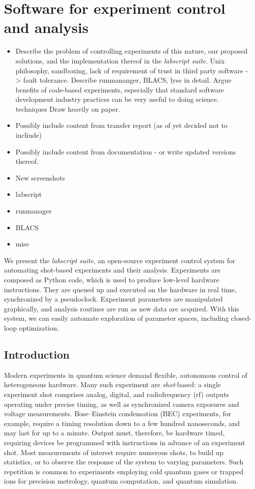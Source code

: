 \chapter{Software for experiment control and analysis}\label{chap:software}

\begin{itemize}
\item Describe the problem of controlling experiments of this nature, our proposed solutions, and the implementation thereof in the \emph{labscript suite}. Unix philosophy, sandboxing, lack of requirement of trust in third party software -> fault tolerance. Describe runmananger, BLACS, lyse in detail. Argue benefits of code-based experiments, especially that standard software development industry practices can be very useful to doing science. techniques Draw heavily on paper.
\item Possibly include content from transfer report (as of yet decided not to incliude)
\item Possibly include content from documentation - or write updated versions thereof.
\item New screenshots
\item{labscript}
\item{runmanager}
\item{BLACS}
\item{mise}
\end{itemize}

We present the \textit{labscript suite}, an open-source experiment control system for automating shot-based experiments and their analysis.
Experiments are composed as Python code, which is used to produce low-level hardware instructions.
They are queued up and executed on the hardware in real time, synchronized by a pseudoclock.
Experiment parameters are manipulated graphically, and analysis routines are run as new data are acquired.
With this system, we can easily automate exploration of parameter spaces, including closed-loop optimization.


\section{Introduction}
Modern experiments in quantum science demand flexible, autonomous control of heterogeneous hardware.
Many such experiment are \textit{shot}-based: a single experiment shot comprises analog, digital, and radiofrequency (rf) outputs operating under precise timing, as well as synchronized camera exposures and voltage measurements.
Bose--Einstein condensation (BEC) experiments\cite{weidemuller_cold_2009}, for example, require a timing resolution down to a few hundred nanoseconds, and may last for up to a minute.
Output must, therefore, be hardware timed, requiring devices be programmed with instructions in advance of an experiment shot.
Most measurements of interest require numerous shots, to build up statistics, or to observe the response of the system to varying parameters.
Such repetition is common to experiments employing cold quantum gases or trapped ions for precision metrology\cite{robins_atom_2013, cronin_optics_2009}, quantum computation\cite{negretti_quantum_2011, ladd_quantum_2010}, and quantum simulation\cite{bloch_quantum_2012,blatt_quantum_2012}.

